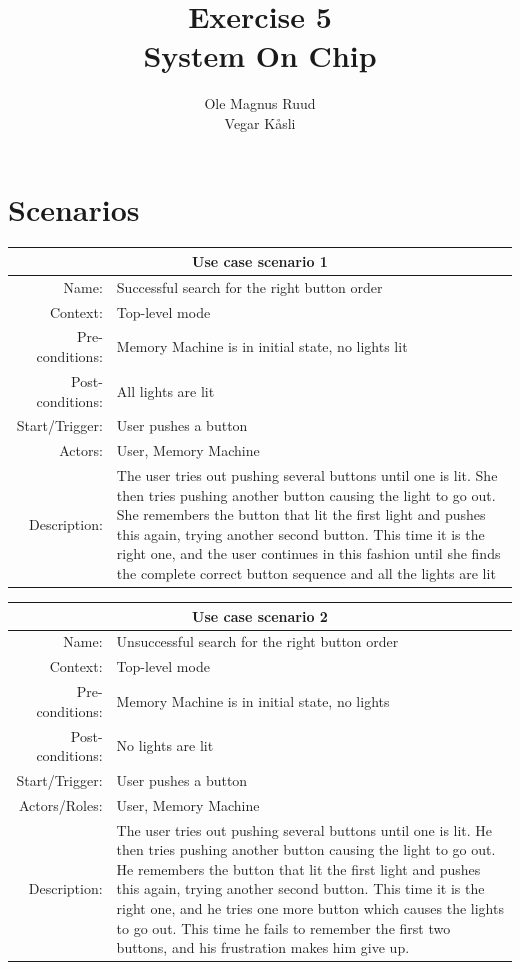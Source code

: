 \documentclass{article}
\title{Exercise 5\\System On Chip}
\author{Ole Magnus Ruud\\Vegar K\aa sli}
\begin{document}
\maketitle{}
\section{Scenarios}
\begin{center}
  \begin{tabular}{|r|p{8cm}|}
    \hline
\multicolumn{2}{|c|}{Use case scenario 1}\\\hline
Name:&Successful search for the right button order\\\hline
Context:&Top-level mode\\\hline
Pre-conditions:&Memory Machine is in initial state, no lights lit\\\hline
Post-conditions:&All lights are lit\\\hline
Start/Trigger:&User pushes a button\\\hline
Actors:&User, Memory Machine\\\hline
Description:&The user tries out pushing several buttons until one is lit. She then
    tries pushing another button causing the light to go out. She remembers
    the button that lit the first light and pushes this again, trying another
    second button. This time it is the right one, and the user continues in this
    fashion until she finds the complete correct button sequence and all the lights
    are lit\\\hline

  \end{tabular}
\end{center}


\begin{center}
  \begin{tabular}{|r|p{8cm}|}
    \hline
\multicolumn{2}{|c|}{Use case scenario 2}\\\hline
Name:&Unsuccessful search for the right button order\\\hline
Context:&Top-level mode\\\hline
Pre-conditions:&Memory Machine is in initial state, no lights\\\hline
Post-conditions:&No lights are lit\\\hline
Start/Trigger:&User pushes a button\\\hline
Actors/Roles:&User, Memory Machine\\\hline
Description:&
    The user tries out pushing several buttons until one is lit. He then
    tries pushing another button causing the light to go out. He remembers 
    the button that lit the first light and pushes this again, trying another
    second button. This time it is the right one, and he tries one more button
    which causes the lights to go out. This time he fails to remember the 
    first two buttons, and his frustration makes him give up.\\\hline

  \end{tabular}
\end{center}
\end{document}
